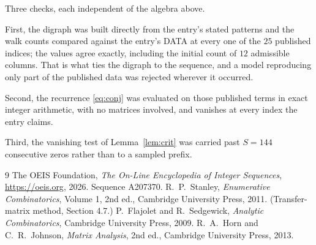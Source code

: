 \documentclass[11pt,a4paper]{article}
\theoremstyle{plain}
\theoremstyle{definition}
\begin{document}
Three checks, each independent of the algebra above.

First, the digraph was built directly from the entry's stated patterns and the walk counts
compared against the entry's DATA at every one of the $25$ published indices; the
values agree exactly, including the initial count of $12$ admissible columns. That is
what ties the digraph to the sequence, and a model reproducing only part of the published
data was rejected wherever it occurred.

Second, the recurrence \eqref{eq:conj} was evaluated on those published terms in exact
integer arithmetic, with no matrices involved, and vanishes at every index the entry claims.

Third, the vanishing test of Lemma~\ref{lem:crit} was carried past $S=144$ consecutive
zeros rather than to a sampled prefix.

\begin{thebibliography}{9}
 The OEIS Foundation, \emph{The On-Line Encyclopedia of Integer
Sequences}, \url{https://oeis.org}, 2026. Sequence A207370.
 R.~P.~Stanley, \emph{Enumerative Combinatorics}, Volume 1, 2nd ed.,
Cambridge University Press, 2011. (Transfer-matrix method, Section 4.7.)
 P.~Flajolet and R.~Sedgewick, \emph{Analytic Combinatorics}, Cambridge
University Press, 2009.
 R.~A.~Horn and C.~R.~Johnson, \emph{Matrix Analysis}, 2nd ed., Cambridge
University Press, 2013.
\end{thebibliography}
\end{document}
